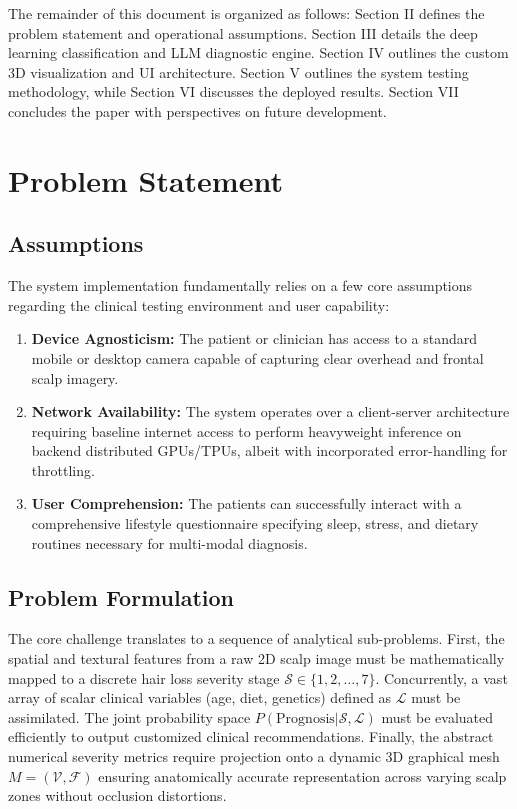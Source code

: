 \documentclass[12pt, a4paper]{article}
\begin{document}
The remainder of this document is organized as follows: Section II defines the problem statement and operational assumptions. Section III details the deep learning classification and LLM diagnostic engine. Section IV outlines the custom 3D visualization and UI architecture. Section V outlines the system testing methodology, while Section VI discusses the deployed results. Section VII concludes the paper with perspectives on future development.

\section{Problem Statement}

\subsection{Assumptions}
The system implementation fundamentally relies on a few core assumptions regarding the clinical testing environment and user capability:
\begin{enumerate}
    \item \textbf{Device Agnosticism:} The patient or clinician has access to a standard mobile or desktop camera capable of capturing clear overhead and frontal scalp imagery.
    \item \textbf{Network Availability:} The system operates over a client-server architecture requiring baseline internet access to perform heavyweight inference on backend distributed GPUs/TPUs, albeit with incorporated error-handling for throttling.
    \item \textbf{User Comprehension:} The patients can successfully interact with a comprehensive lifestyle questionnaire specifying sleep, stress, and dietary routines necessary for multi-modal diagnosis.
\end{enumerate}

\subsection{Problem Formulation}
The core challenge translates to a sequence of analytical sub-problems. First, the spatial and textural features from a raw 2D scalp image must be mathematically mapped to a discrete hair loss severity stage $\mathcal{S} \in \{1, 2, \dots, 7\}$. Concurrently, a vast array of scalar clinical variables (age, diet, genetics) defined as $\mathcal{L}$ must be assimilated. The joint probability space $P(\text{Prognosis} | \mathcal{S}, \mathcal{L})$ must be evaluated efficiently to output customized clinical recommendations. Finally, the abstract numerical severity metrics require projection onto a dynamic 3D graphical mesh $M=(\mathcal{V}, \mathcal{F})$ ensuring anatomically accurate representation across varying scalp zones without occlusion distortions.
\end{document}

